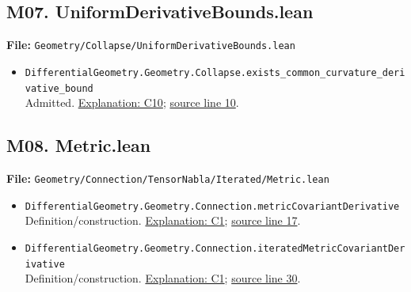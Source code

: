 \documentclass[
  letterpaper,
  11pt]{article}
\providecommand{\tightlist}{%
  \setlength{\itemsep}{0pt}\setlength{\parskip}{0pt}}
\begin{document}

\subsection{M07.
UniformDerivativeBounds.lean}\label{m07.-uniformderivativebounds.lean}

\textbf{File:}
{\small\texttt{Geometry/\allowbreak{}Collapse/\allowbreak{}Uniform\allowbreak{}Derivative\allowbreak{}Bounds.\allowbreak{}lean}}

\begin{itemize}
\tightlist
\item
  {\small\texttt{Differential\allowbreak{}Geometry.\allowbreak{}Geometry.\allowbreak{}Collapse.\allowbreak{}exists\_\allowbreak{}common\_\allowbreak{}curvature\_\allowbreak{}derivative\_\allowbreak{}bound}}\\
  Admitted. \hyperref[collapse-uniform]{Explanation: C10};
  \href{https://github.com/qinz1yang/differential-geometry-dev/blob/ea0fae60ee01ef8c8d9b57a51794c6538f679c5d/DifferentialGeometry/Geometry/Collapse/UniformDerivativeBounds.lean\#L10}{source
  line 10}.
\end{itemize}


\subsection{M08. Metric.lean}\label{m08.-metric.lean}

\textbf{File:}
{\small\texttt{Geometry/\allowbreak{}Connection/\allowbreak{}Tensor\allowbreak{}Nabla/\allowbreak{}Iterated/\allowbreak{}Metric.\allowbreak{}lean}}

\begin{itemize}
\item
  {\small\texttt{Differential\allowbreak{}Geometry.\allowbreak{}Geometry.\allowbreak{}Connection.\allowbreak{}metric\allowbreak{}Covariant\allowbreak{}Derivative}}\\
  Definition/construction. \hyperref[collapse-tensor]{Explanation: C1};
  \href{https://github.com/qinz1yang/differential-geometry-dev/blob/ea0fae60ee01ef8c8d9b57a51794c6538f679c5d/DifferentialGeometry/Geometry/Connection/TensorNabla/Iterated/Metric.lean\#L17}{source
  line 17}.
\item
  {\small\texttt{Differential\allowbreak{}Geometry.\allowbreak{}Geometry.\allowbreak{}Connection.\allowbreak{}iterated\allowbreak{}Metric\allowbreak{}Covariant\allowbreak{}Derivative}}\\
  Definition/construction. \hyperref[collapse-tensor]{Explanation: C1};
  \href{https://github.com/qinz1yang/differential-geometry-dev/blob/ea0fae60ee01ef8c8d9b57a51794c6538f679c5d/DifferentialGeometry/Geometry/Connection/TensorNabla/Iterated/Metric.lean\#L30}{source
  line 30}.
\end{itemize}
\end{document}
